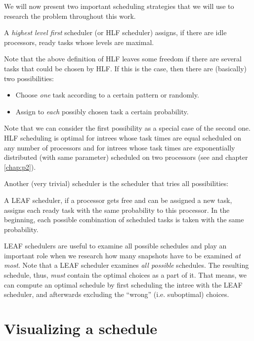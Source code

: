 We will now present two important scheduling strategies that we will use to research the problem throughout this work.

\begin{definition}
  A \emph{highest level first} scheduler (or HLF scheduler) assigns, if there are idle processors, ready tasks whose levels are maximal.
\end{definition}

Note that the above definition of HLF leaves some freedom if there are several tasks that could be chosen by HLF. If this is the case, then there are (basically) two possibilities:
\begin{itemize}
\item Choose \emph{one} task according to a certain pattern or randomly.
\item Assign to \emph{each} possibly chosen task a certain probability.
\end{itemize}

Note that we can consider the first possibility as a special case of the second one. HLF scheduling is optimal for intrees whose task times are equal scheduled on any number of processors \cite{hu:1961:hlfoptimalforknowntimesintree} and for intrees whose task times are exponentially distributed (with same parameter) scheduled on two processors (see \cite{chandyreynoldsshortpaper1975} and chapter \ref{chap:p2}). 

Another (very trivial) scheduler is the scheduler that tries all possibilities:

\begin{definition}
  A LEAF scheduler, if a processor gets free and can be assigned a new task, assigns each ready task with the same probability to this processor. In the beginning, each possible combination of scheduled tasks is taken with the same probability.
\end{definition}

LEAF schedulers are useful to examine all possible schedules and play an important role when we research how many snapshots have to be examined \emph{at most}. Note that a LEAF scheduler examines \emph{all possible} schedules. The resulting schedule, thus, \emph{must} contain the optimal choices as a part of it. That means, we can compute an optimal schedule by first scheduling the intree with the LEAF scheduler, and afterwards excluding the ``wrong'' (i.e. suboptimal) choices.

\section{Visualizing a schedule}
\label{sec:intro-visualizing-schedules}

